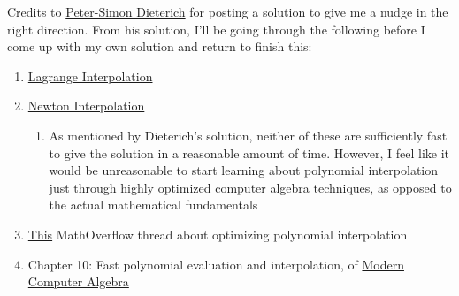 \documentclass{article}
\begin{document}
Credits to \href{}{Peter-Simon Dieterich} for posting a solution to give me a nudge in the right direction.
From his solution, I'll be going through the following before I come up with my own solution and return to finish this:
\begin{enumerate}
    \item \href{https://en.wikipedia.org/wiki/Lagrange_polynomial}{Lagrange Interpolation}
    \item \href{https://en.wikipedia.org/wiki/Newton_polynomial}{Newton Interpolation}
    \begin{enumerate}
        \item As mentioned by Dieterich's solution, neither of these are sufficiently fast to give the solution in
              a reasonable amount of time. However, I feel like it would be unreasonable to start learning about polynomial
              interpolation just through highly optimized computer algebra techniques, as opposed to the actual 
              mathematical fundamentals
    \end{enumerate}
    \item \href{https://mathoverflow.net/questions/408666/fastest-implementation-of-polynomial-interpolation/458091#458091}{This}
          MathOverflow thread about optimizing polynomial interpolation 
    \item Chapter 10: Fast polynomial evaluation and interpolation, of 
    \href{https://www.cambridge.org/core/books/modern-computer-algebra/DB3563D4013401734851CF683D2F03F0}{Modern Computer Algebra}
\end{enumerate}


\newpage
\end{document}

